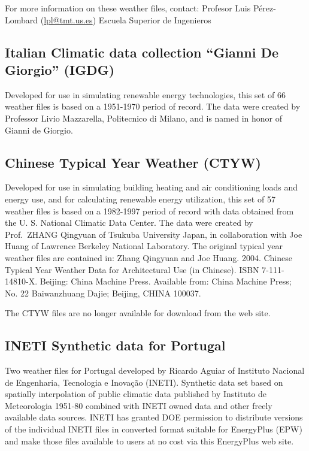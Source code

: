 For more information on these weather files, contact: Profesor Luis Pérez-Lombard (\href{file:///E:/Docs4PDFs/lpl@tmt.us.es}{lpl@tmt.us.es}) Escuela Superior de Ingenieros

\subsection{\texorpdfstring{Italian Climatic data collection ``Gianni De Giorgio'' (IGDG)}{Italian Climatic data collection Gianni De Giorgio (IGDG)}}\label{italian-climatic-data-collection-gianni-de-giorgio-igdg}

Developed for use in simulating renewable energy technologies, this set of 66 weather files is based on a 1951-1970 period of record. The data were created by Professor Livio Mazzarella, Politecnico di Milano, and is named in honor of Gianni de Giorgio.

\subsection{Chinese Typical Year Weather (CTYW)}\label{chinese-typical-year-weather-ctyw}

Developed for use in simulating building heating and air conditioning loads and energy use, and for calculating renewable energy utilization, this set of 57 weather files is based on a 1982-1997 period of record with data obtained from the U. S. National Climatic Data Center. The data were created by Prof.~ZHANG Qingyuan of Tsukuba University Japan, in collaboration with Joe Huang of Lawrence Berkeley National Laboratory. The original typical year weather files are contained in: Zhang Qingyuan and Joe Huang. 2004. Chinese Typical Year Weather Data for Architectural Use (in Chinese). ISBN 7-111-14810-X. Beijing: China Machine Press. Available from: China Machine Press; No. 22 Baiwanzhuang Dajie; Beijing, CHINA 100037.

The CTYW files are no longer available for download from the web site.

\subsection{INETI Synthetic data for Portugal}\label{ineti-synthetic-data-for-portugal}

Two weather files for Portugal developed by Ricardo Aguiar of Instituto Nacional de Engenharia, Tecnologia e Inovação (INETI). Synthetic data set based on spatially interpolation of public climatic data published by Instituto de Meteorologia 1951-80 combined with INETI owned data and other freely available data sources. INETI has granted DOE permission to distribute versions of the individual INETI files in converted format suitable for EnergyPlus (EPW) and make those files available to users at no cost via this EnergyPlus web site.

